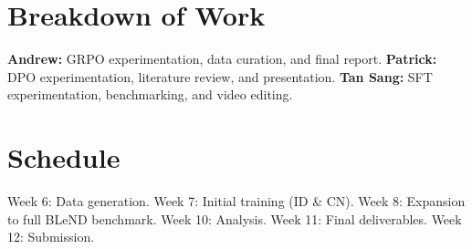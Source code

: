 \documentclass[11pt]{article}
\begin{document}
\section{Breakdown of Work}
\textbf{Andrew:} GRPO experimentation, data curation, and final report. \textbf{Patrick:} DPO experimentation, literature review, and presentation. \textbf{Tan Sang:} SFT experimentation, benchmarking, and video editing.

\section{Schedule} 
Week 6: Data generation. Week 7: Initial training (ID \& CN). Week 8: Expansion to full BLeND benchmark. Week 10: Analysis. Week 11: Final deliverables. Week 12: Submission.




\end{document}
